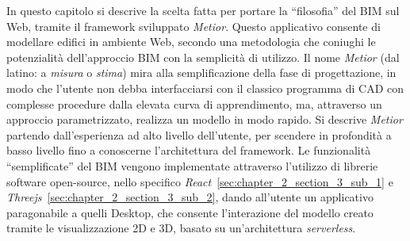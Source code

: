 In questo capitolo si descrive la scelta fatta per portare la ``filosofia'' del BIM sul Web, tramite il framework sviluppato
\emph{Metior}.
Questo applicativo consente di modellare edifici in ambiente Web, secondo una metodologia che coniughi le potenzialità
dell’approccio BIM con la semplicità di utilizzo.
Il nome \emph{Metior} (dal latino: a \emph{misura} o \emph{stima}) mira alla semplificazione della fase di progettazione,
in modo che l'utente non debba interfacciarsi con il classico programma
di CAD con complesse procedure dalla elevata curva di apprendimento, ma, attraverso un approccio parametrizzato,
realizza un modello in modo rapido.
Si descrive \emph{Metior} partendo dall'esperienza ad alto livello dell'utente, per scendere in profondità
a basso livello fino a conoscerne l'architettura del framework.
Le funzionalità ``semplificate'' del BIM vengono implementate attraverso l'utilizzo di librerie software open-source,
nello specifico \emph{React}~\ref{sec:chapter_2_section_3_sub_1}
 e \emph{Threejs}~\ref{sec:chapter_2_section_3_sub_2}, dando all'utente un applicativo paragonabile a quelli
Desktop, che consente l'interazione del modello creato tramite le visualizzazione 2D e 3D, basato su un'architettura \emph{serverless}.
\newpage
